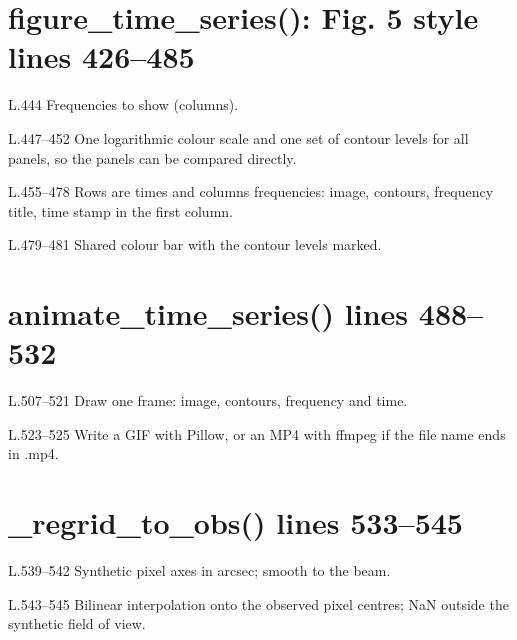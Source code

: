 \section*{\normalsize figure\_time\_series(): Fig. 5 style \hfill{\small\mdseries\color{gray}lines 426--485}}

\begin{lines}
\item[L.444] Frequencies to show (columns).
\item[L.447–452] One logarithmic colour scale and one set of contour levels for all panels, so the panels can be compared directly.
\item[L.455–478] Rows are times and columns frequencies: image, contours, frequency title, time stamp in the first column.
\item[L.479–481] Shared colour bar with the contour levels marked.
\end{lines}
\section*{\normalsize animate\_time\_series() \hfill{\small\mdseries\color{gray}lines 488--532}}

\begin{lines}
\item[L.507–521] Draw one frame: image, contours, frequency and time.
\item[L.523–525] Write a GIF with Pillow, or an MP4 with ffmpeg if the file name ends in .mp4.
\end{lines}
\section*{\normalsize \_regrid\_to\_obs() \hfill{\small\mdseries\color{gray}lines 533--545}}

\begin{lines}
\item[L.539–542] Synthetic pixel axes in arcsec; smooth to the beam.
\item[L.543–545] Bilinear interpolation onto the observed pixel centres; NaN outside the synthetic field of view.
\end{lines}
